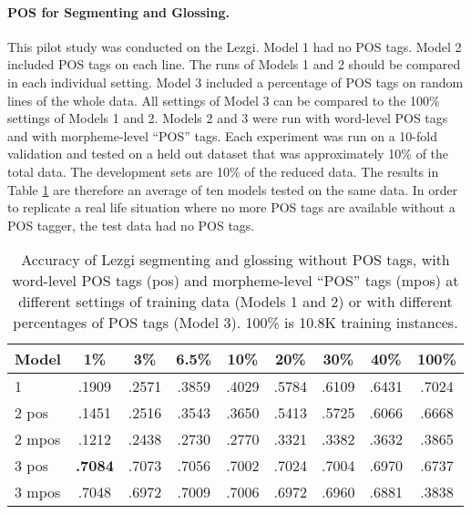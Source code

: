 \paragraph{POS for Segmenting and Glossing.}
This pilot study was conducted on the Lezgi. Model 1 had no POS tags. Model 2 included POS tags on each line. The runs of Models 1 and 2 should be compared in each individual setting. Model 3 included a percentage of POS tags on random lines of the whole data. All settings of Model 3 can be compared to the 100\% settings of Models 1 and 2. Models 2 and 3 were run with word-level POS tags and with morpheme-level ``POS'' tags. Each experiment was run on a 10-fold validation and tested on a held out dataset that was approximately 10\% of the total data. The development sets are 10\% of the reduced data. The results in Table \ref{tab:POSSG} are therefore an average of ten models tested on the same data. In order to replicate a real life situation where no more POS tags are available without a POS tagger, the test data had no POS tags. 

\begin{table}[]
    \centering
    \begin{tabular}{l|cccccccc}
       \textbf{Model} & \textbf{1\%} & \textbf{3\%} & \textbf{6.5\%} & \textbf{10\%} & \textbf{20\%} & \textbf{30\%} & \textbf{40\%} & \textbf{100\%} \\
      \hline
       1       & .1909 & .2571 & .3859 & .4029 & .5784 & .6109 & .6431 & .7024   \\
       \hline
       2 pos   & .1451 & .2516 & .3543 & .3650 & .5413 & .5725 & .6066 & .6668  \\
       2 mpos  & .1212 & .2438 & .2730 & .2770 & .3321 & .3382 & .3632 & .3865  \\
       \hline
       3 pos   & \textbf{.7084} & .7073 & .7056 & .7002 & .7024 & .7004 & .6970 & .6737  \\
       3 mpos  & .7048 & .6972  & .7009 & .7006 & .6972 & .6960 & .6881 & .3838  \\
    \end{tabular}
    \caption[Segmenting and Glossing with/out POS tags]{Accuracy of Lezgi segmenting and glossing without POS tags, with word-level POS tags (pos) and morpheme-level ``POS'' tags (mpos)  at different settings of training data (Models 1 and 2) or with different percentages of POS tags (Model 3). 100\% is 10.8K training instances.}
    \label{tab:POSSG}
\end{table}

